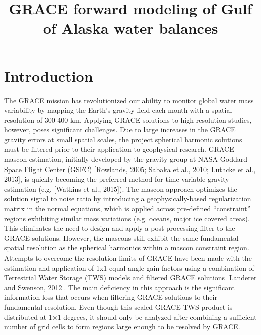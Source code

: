 \documentclass[review,oneside]{igs}
\begin{document}
\title[GRACE Forward Modeling]{GRACE forward modeling of Gulf of Alaska water balances}

\author[Arendt and others]{ }



\maketitle

\section{Introduction}

The GRACE mission has revolutionized our ability to monitor global water mass variability by mapping the Earth’s gravity field each month with a spatial resolution of 300-400 km. Applying GRACE solutions to high-resolution studies, however, poses significant challenges. Due to large increases in the GRACE gravity errors at small spatial scales, the project spherical harmonic solutions must be filtered prior to their application to geophysical research. GRACE mascon estimation, initially developed by the gravity group at NASA Goddard Space Flight Center (GSFC) [Rowlands, 2005; Sabaka et al., 2010; Luthcke et al., 2013], is quickly becoming the preferred method for time-variable gravity estimation (e.g. [Watkins et al., 2015]). The mascon approach optimizes the solution signal to noise ratio by introducing a geophysically-based regularization matrix in the normal equations, which is applied across pre-defined ``constraint'' regions exhibiting similar mass variations (e.g. oceans, major ice covered areas). This eliminates the need to design and apply a post-processing filter to the GRACE solutions. However, the mascons still exhibit the same fundamental spatial resolution as the spherical harmonics within a mascon constraint region. Attempts to overcome the resolution limits of GRACE have been made with the estimation and application of 1x1 equal-angle gain factors using a combination of Terrestrial Water Storage (TWS) models and filtered GRACE solutions [Landerer and Swenson, 2012]. The main deficiency in this approach is the significant information loss that occurs when filtering GRACE solutions to their fundamental resolution. Even though this scaled GRACE TWS product is distributed at 1×1 degrees, it should only be analyzed after combining a sufficient number of grid cells to form regions large enough to be resolved by GRACE.
\end{document}
